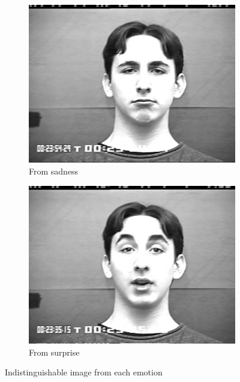 \begin{figure}
\begin{subfigure}[b]{0.2\textwidth}
		\includegraphics[width=\textwidth]{./img/indistinguishable/sadness.png}
		\caption{From sadness}
		\label{fig:indistinguishable:sadness}
	\end{subfigure}
	\begin{subfigure}[b]{0.2\textwidth}
		\includegraphics[width=\textwidth]{./img/indistinguishable/surprise.png}
		\caption{From surprise}
		\label{fig:indistinguishable:surprise}
	\end{subfigure}
    \caption{Indistinguishable image from each emotion}
    \label{Indistinguishable images from six emotions}
\end{figure}

